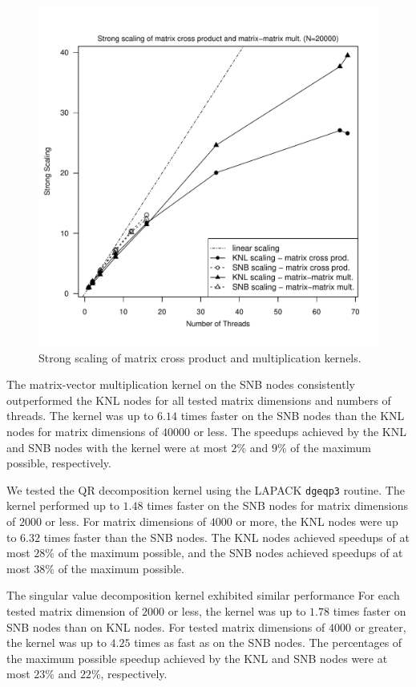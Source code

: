 \begin{figure}
\includegraphics[height=\columnwidth, width=\columnwidth]{cross_matmat_20000_68-ss.pdf}
\caption{Strong scaling of matrix cross product and multiplication kernels.}
\label{fig:crossMatmatScale}
\end{figure}

The matrix-vector multiplication kernel on the SNB nodes consistently
  outperformed the KNL nodes for all tested matrix dimensions and numbers of
  threads.
The kernel was up to $6.14$ times faster on the SNB nodes than the KNL nodes for
  matrix dimensions of $40000$ or less.
The speedups achieved by the KNL and SNB nodes with the kernel were at most
  $2\%$ and $9\%$ of the maximum possible, respectively.

We tested the QR decomposition kernel using the LAPACK \texttt{dgeqp3}
  routine.
The kernel performed up to $1.48$ times faster on the SNB nodes for
  matrix dimensions of $2000$ or less.
For matrix dimensions of $4000$ or more, the KNL nodes were up to
  $6.32$ times faster than the SNB nodes.
The KNL nodes achieved speedups of at most $28\%$ of the maximum possible, and
  the SNB nodes achieved speedups of at most $38\%$ of the maximum possible.

The singular value decomposition kernel exhibited similar performance
For each tested matrix dimension of $2000$ or less, the kernel was
  up to $1.78$ times faster on SNB nodes than on KNL nodes.
For tested matrix dimensions of $4000$ or greater, the kernel was up to $4.25$
  times as fast as on the SNB nodes.
The percentages of the maximum possible speedup achieved by the KNL
  and SNB nodes were at most $23\%$ and $22\%$, respectively.

